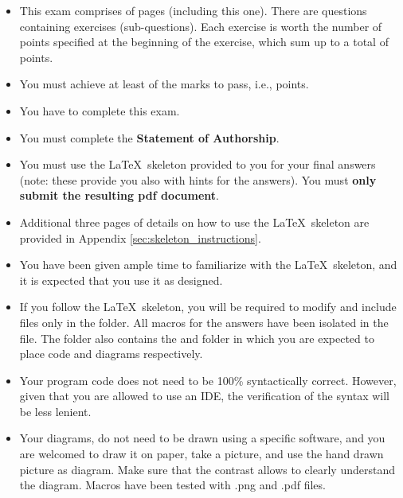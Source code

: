 
\begin{itemize}
	\setlength\itemsep{0em}
	\item This exam comprises of \epages pages (including this one).  There are \equestions questions containing exercises (sub-questions). Each exercise is worth the number of points specified at the beginning of the exercise, which sum up to a total of \epoints points.
	\item You must achieve at least \ethreshold of the marks to pass, i.e., \epointstopass points.
	\item You have \elength to complete this exam.
	\item You must complete the \textbf{Statement of Authorship}.
	\item You must use the \LaTeX\ skeleton provided to you for your final answers (note: these provide you also with hints for the answers).  You must \textbf{only submit the resulting pdf document}. 
	\item Additional three pages of details on how to use the \LaTeX\ skeleton are provided in Appendix \ref{sec:skeleton_instructions}.
	\end{itemize}

\vfill
\begin{itemize}
	\setlength\itemsep{0em}
	\item You have been given ample time to familiarize with the \LaTeX\ skeleton, and it is expected that you use it as designed.
	\item If you follow the \LaTeX\ skeleton, you will be required to modify and include files only in the  folder.  All macros for the answers have been isolated in the  file.  The folder also contains the  and  folder in which you are expected to place code and diagrams respectively.
	\item Your program code does not need to be 100\% syntactically correct.  However, given that you are allowed to use an IDE, the verification of the syntax will be less lenient.
	\item Your diagrams, do not need to be drawn using a specific software, and you are welcomed to draw it on paper, take a picture, and use the hand drawn picture as diagram.  Make sure that the contrast allows to clearly understand the diagram.  Macros have been tested with .png and .pdf files.
\end{itemize}



